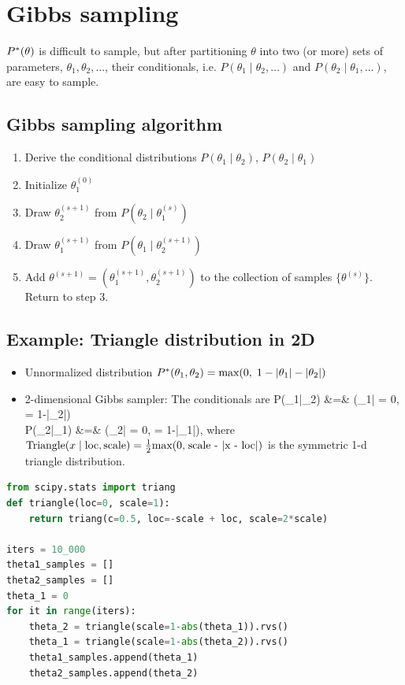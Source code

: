 \section{Gibbs sampling}
 $P^\ast(\theta)$ is difficult to sample, but after partitioning $\theta$ into two (or more) sets of parameters, $\theta_1, \theta_2, \ldots$, their conditionals, i.e. $P(\theta_1\;|\;\theta_2, \ldots)$ and $P(\theta_2\;|\;\theta_1, \ldots)$, are easy to sample.

\subsection{Gibbs sampling algorithm}
\begin{enumerate}
	\item Derive the conditional distributions $P(\theta_1\;|\;\theta_2)$, $P(\theta_2\;|\;\theta_1)$
	\item Initialize $\theta_1^{(0)}$
	\item Draw $\theta_2^{(s+1)}$ from $P(\theta_2\;|\;\theta_1^{(s)})$
	\item Draw $\theta_1^{(s+1)}$ from $P(\theta_1\;|\;\theta_2^{(s+1)})$
	\item Add $\theta^{(s+1)} = (\theta_1^{(s+1)}, \theta_2^{(s+1)})$ to the collection of samples $\{\theta^{(s)}\}$. Return to step 3.
\end{enumerate}

\subsection{Example: Triangle distribution in 2D}
\begin{itemize}
	\item Unnormalized distribution $P^\ast(\theta_1, \theta_2) = \text{max} (0,\;1 - |\theta_1| - |\theta_2|)$
	\item 2-dimensional Gibbs sampler: The conditionals are
		\ba
		P(\theta_1\;|\;\theta_2) &=& (\theta_1\;|\; = 0,  = 1-|\theta_2|) 
		\\
		P(\theta_2\;|\;\theta_1) &=& (\theta_2\;|\; = 0,  = 1-|\theta_1|),
		\ea
		where $\text{Triangle}(x\;|\;\text{loc}, \text{scale}) = \frac{1}{2}\text{max(0,\;\text{scale} - |x - \text{loc}|)}$ is the symmetric 1-d triangle distribution.
\end{itemize}
\begin{lstlisting}[language=python]
from scipy.stats import triang
def triangle(loc=0, scale=1):
    return triang(c=0.5, loc=-scale + loc, scale=2*scale)

iters = 10_000
theta1_samples = []
theta2_samples = []
theta_1 = 0
for it in range(iters):
    theta_2 = triangle(scale=1-abs(theta_1)).rvs()
    theta_1 = triangle(scale=1-abs(theta_2)).rvs()
    theta1_samples.append(theta_1)
    theta2_samples.append(theta_2)
\end{lstlisting}


